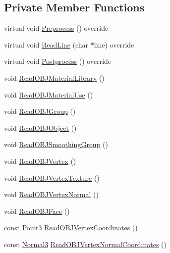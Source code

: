 \subsection*{Private Member Functions}
\begin{DoxyCompactItemize}
\item 
virtual void \hyperlink{classmage_1_1loader_1_1_o_b_j_reader_a42cb85a0d14f9cc1caff68ae2cf84301}{Preprocess} () override
\item 
virtual void \hyperlink{classmage_1_1loader_1_1_o_b_j_reader_a9a66ccf1569bdef5194dae20f6282186}{Read\+Line} (char $\ast$line) override
\item 
virtual void \hyperlink{classmage_1_1loader_1_1_o_b_j_reader_ae8bc7d40a019523546d61bdfd599c368}{Postprocess} () override
\item 
void \hyperlink{classmage_1_1loader_1_1_o_b_j_reader_a27f8eb41fe4b8e2e813cda123bfb7b52}{Read\+O\+B\+J\+Material\+Library} ()
\item 
void \hyperlink{classmage_1_1loader_1_1_o_b_j_reader_ad49aa2f827708f82adacf9e77c368937}{Read\+O\+B\+J\+Material\+Use} ()
\item 
void \hyperlink{classmage_1_1loader_1_1_o_b_j_reader_a7e647974904ac60f1b2e0276669957eb}{Read\+O\+B\+J\+Group} ()
\item 
void \hyperlink{classmage_1_1loader_1_1_o_b_j_reader_ab68b5743b7a97a2d9e0c5e58d32fc9b8}{Read\+O\+B\+J\+Object} ()
\item 
void \hyperlink{classmage_1_1loader_1_1_o_b_j_reader_a55f0cc67dc459f188aaa192c8e2c99d0}{Read\+O\+B\+J\+Smoothing\+Group} ()
\item 
void \hyperlink{classmage_1_1loader_1_1_o_b_j_reader_a27f85f1786398a540fefa34055683e92}{Read\+O\+B\+J\+Vertex} ()
\item 
void \hyperlink{classmage_1_1loader_1_1_o_b_j_reader_a52d24ac07533b470b91ff0a2ca8875df}{Read\+O\+B\+J\+Vertex\+Texture} ()
\item 
void \hyperlink{classmage_1_1loader_1_1_o_b_j_reader_a999fe73e83855955723855c09955c7da}{Read\+O\+B\+J\+Vertex\+Normal} ()
\item 
void \hyperlink{classmage_1_1loader_1_1_o_b_j_reader_a46b46fd7f1708be7db0d760e41fe959e}{Read\+O\+B\+J\+Face} ()
\item 
const \hyperlink{structmage_1_1_point3}{Point3} \hyperlink{classmage_1_1loader_1_1_o_b_j_reader_a0764ffe56593a84cf4a7613e0a61ed50}{Read\+O\+B\+J\+Vertex\+Coordinates} ()
\item 
const \hyperlink{structmage_1_1_normal3}{Normal3} \hyperlink{classmage_1_1loader_1_1_o_b_j_reader_abda4acd21665bf5284c8073a73886672}{Read\+O\+B\+J\+Vertex\+Normal\+Coordinates} ()

\end{DoxyCompactItemize}
